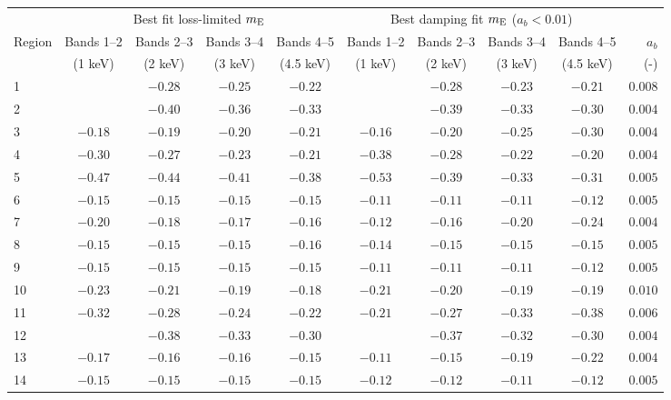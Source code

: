 \begin{tabular}{@{}l cccc cccc r@{}}
\toprule
{} & \multicolumn{4}{c}{Best fit loss-limited $m_\mathrm{E}$}
   & \multicolumn{4}{c}{Best damping fit $m_\mathrm{E}$ ($a_b < 0.01$)} \\
\cmidrule(lr){2-5} \cmidrule(l){6-10}

Region & Bands 1--2 & Bands 2--3 & Bands 3--4 & Bands 4--5
       & Bands 1--2 & Bands 2--3 & Bands 3--4 & Bands 4--5 & $a_b$ \\ [0.2em]
{} & (1 keV) & (2 keV) & (3 keV) & (4.5 keV)
   & (1 keV) & (2 keV) & (3 keV) & (4.5 keV) & (-) \\

\midrule
1  &         & $-0.28$ & $-0.25$ & $-0.22$ &         & $-0.28$ & $-0.23$ & $-0.21$ & $0.008$ \\
2  &         & $-0.40$ & $-0.36$ & $-0.33$ &         & $-0.39$ & $-0.33$ & $-0.30$ & $0.004$ \\
3  & $-0.18$ & $-0.19$ & $-0.20$ & $-0.21$ & $-0.16$ & $-0.20$ & $-0.25$ & $-0.30$ & $0.004$ \\
\cmidrule{1-10}
4  & $-0.30$ & $-0.27$ & $-0.23$ & $-0.21$ & $-0.38$ & $-0.28$ & $-0.22$ & $-0.20$ & $0.004$ \\
5  & $-0.47$ & $-0.44$ & $-0.41$ & $-0.38$ & $-0.53$ & $-0.39$ & $-0.33$ & $-0.31$ & $0.005$ \\
6  & $-0.15$ & $-0.15$ & $-0.15$ & $-0.15$ & $-0.11$ & $-0.11$ & $-0.11$ & $-0.12$ & $0.005$ \\
7  & $-0.20$ & $-0.18$ & $-0.17$ & $-0.16$ & $-0.12$ & $-0.16$ & $-0.20$ & $-0.24$ & $0.004$ \\
8  & $-0.15$ & $-0.15$ & $-0.15$ & $-0.16$ & $-0.14$ & $-0.15$ & $-0.15$ & $-0.15$ & $0.005$ \\
9  & $-0.15$ & $-0.15$ & $-0.15$ & $-0.15$ & $-0.11$ & $-0.11$ & $-0.11$ & $-0.12$ & $0.005$ \\
10 & $-0.23$ & $-0.21$ & $-0.19$ & $-0.18$ & $-0.21$ & $-0.20$ & $-0.19$ & $-0.19$ & $0.010$ \\
\cmidrule{1-10}
11 & $-0.32$ & $-0.28$ & $-0.24$ & $-0.22$ & $-0.21$ & $-0.27$ & $-0.33$ & $-0.38$ & $0.006$ \\
12 &         & $-0.38$ & $-0.33$ & $-0.30$ &         & $-0.37$ & $-0.32$ & $-0.30$ & $0.004$ \\
13 & $-0.17$ & $-0.16$ & $-0.16$ & $-0.15$ & $-0.11$ & $-0.15$ & $-0.19$ & $-0.22$ & $0.004$ \\
\cmidrule{1-10}
14 & $-0.15$ & $-0.15$ & $-0.15$ & $-0.15$ & $-0.12$ & $-0.12$ & $-0.11$ & $-0.12$ & $0.005$ \\

\end{tabular}
